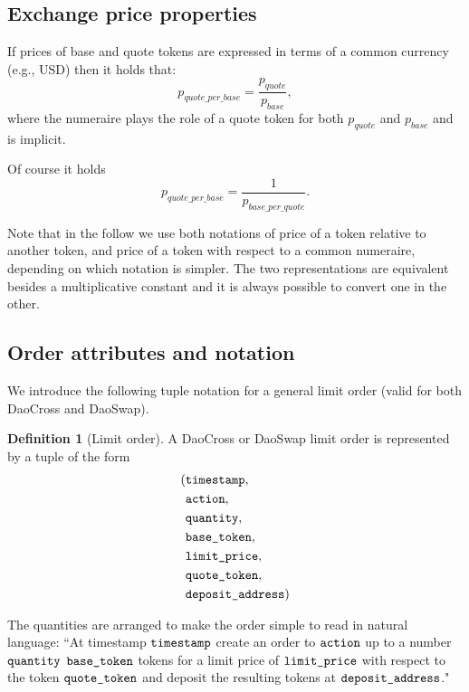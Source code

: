 \documentclass[11pt, reqno]{amsart}
\theoremstyle{definition}
\newtheorem{defn}{Definition}[subsection]
\theoremstyle{remark}
\newcommand{\timestamp}{\textnormal{\texttt{timestamp}}}
\newcommand{\action}{\textnormal{\texttt{action}}}
\newcommand{\quantity}{\textnormal{\texttt{quantity}}}
\newcommand{\basetoken}{\textnormal{\texttt{base\_token}}}
\newcommand{\limitprice}{\textnormal{\texttt{limit\_price}}}
\newcommand{\quotetoken}{\textnormal{\texttt{quote\_token}}}
\newcommand{\depositaddress}{\textnormal{\texttt{deposit\_address}}}
\begin{document}
\subsection{Exchange price properties}
If prices of base and quote tokens are expressed in terms of a common currency
(e.g., USD) then it holds that:
\[
	p_{quote\_per\_base} = \frac{p_{quote}}{p_{base}},
\]
where the numeraire plays the role of a quote token for both $p_{quote}$ and
$p_{base}$ and is implicit.

Of course it holds
\[
	p_{quote\_per\_base} =
	\frac{1}{p_{base\_per\_quote}}.
\]

Note that in the follow we use both notations of price of a token relative to
another token, and price of a token with respect to a common numeraire, depending
on which notation is simpler.
The two representations are equivalent besides a multiplicative constant and
it is always possible to convert one in the other.

\subsection{Order attributes and notation}
We introduce the following tuple notation for a general limit order
(valid for both DaoCross and DaoSwap).
\begin{defn}[Limit order]
A DaoCross or DaoSwap limit order is represented by a tuple of the form
\begin{align*}
( & \timestamp,       \\
  & \action,          \\
  & \quantity,        \\
  & \basetoken,       \\
  & \limitprice,      \\
  & \quotetoken,      \\
  & \depositaddress )
\end{align*}
\end{defn}

The quantities are arranged to make the order simple to read in natural
language:
``At timestamp $\timestamp$ create an order to $\action$ up to a number
$\quantity$ $\basetoken$ tokens for a limit price of $\limitprice$ with respect
to the token $\quotetoken$ and deposit the resulting tokens at
$\depositaddress$."
\end{document}
